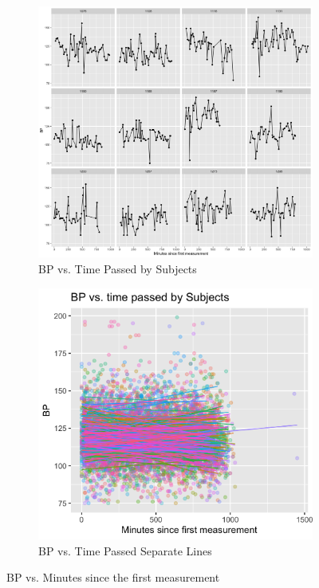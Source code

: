 \documentclass[12pt,twoside,letterpaper]{article}
\theoremstyle{definition}
\theoremstyle{definition}
\begin{document}
\begin{figure} 
\centering
\begin{subfigure}[b]{0.48\textwidth}
\centering
\includegraphics[width=\textwidth]{pics/bp v time by subj.png}
\caption[]%
{{\small BP vs. Time Passed by Subjects}}
\label{fig: bp v time facet}
\end{subfigure}
\hfill
\begin{subfigure}[b]{0.48\textwidth}
\centering
\includegraphics[width=\textwidth]{pics/BP v time LS.png}
\caption[]%
{{\small BP vs. Time Passed Separate Lines}}
\label{fig: bp v time separate ls}
\end{subfigure}
\caption[]
{\small BP vs. Minutes since the first measurement}
\label{fig: bp v time}
\end{figure}
\end{document}
